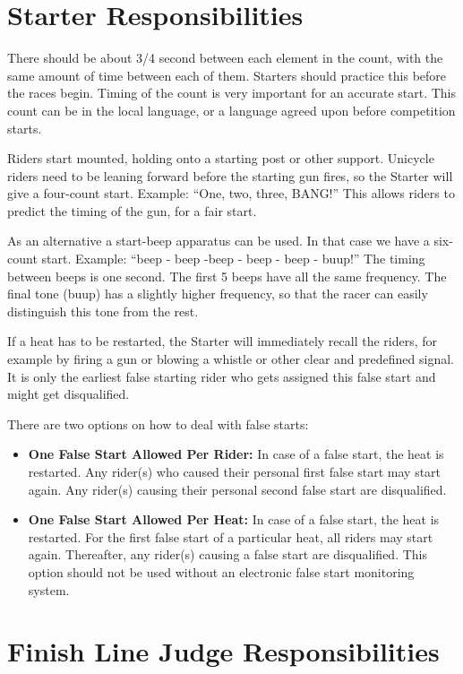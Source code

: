 \section{Starter Responsibilities\label{sec:track_starter}}

There should be about 3/4 second between each element in the count, with the same amount of time between each of them.
Starters should practice this before the races begin.
Timing of the count is very important for an accurate start.
This count can be in the local language, or a language agreed upon before competition starts.

Riders start mounted, holding onto a starting post or other support.
Unicycle riders need to be leaning forward before the starting gun fires, so the Starter will give a four-count start.
Example: ``One, two, three, BANG!''
This allows riders to predict the timing of the gun, for a fair start.

As an alternative a start-beep apparatus can be used.
In that case we have a six-count start.
Example: ``beep - beep -beep - beep - beep - buup!''
The timing between beeps is one second.
The first 5 beeps have all the same frequency.
The final tone (buup) has a slightly higher frequency, so that the racer can easily distinguish this tone from the rest.

If a heat has to be restarted, the Starter will immediately recall the riders, for example by firing a gun or blowing a whistle or other clear and predefined signal.
It is only the earliest false starting rider who gets assigned this false start and might get disqualified.

There are two options on how to deal with false starts:
\begin{itemize}
\item \textbf{One False Start Allowed Per Rider:}
In case of a false start, the heat is restarted.
Any rider(s) who caused their personal first false start may start again.
Any rider(s) causing their personal second false start are disqualified.
\item \textbf{One False Start Allowed Per Heat:} 
In case of a false start, the heat is restarted.
For the first false start of a particular heat, all riders may start again.
Thereafter, any rider(s) causing a false start are disqualified.
This option should not be used without an electronic false start monitoring system.
\end{itemize}

\section{Finish Line Judge Responsibilities}

